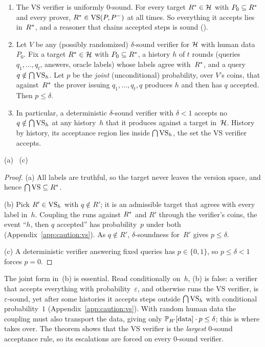 \begin{theorem}\label{thm:caution:vs}
\leavevmode
\begin{enumerate}[label=(\alph*)]
\item The VS verifier is uniformly $0$-sound. For every target $R^{*}\in\mathcal{H}$ with $P_0\subseteq R^{*}$ and every prover, $R^{*}\in\mathrm{VS}(P,P^-)$ at all times. So everything it accepts lies in~$R^{*}$, and a reasoner that chains accepted steps is sound ().
\item Let $V$ be any (possibly randomized) $\delta$-sound verifier for $\mathcal{H}$ with human data $P_0$. Fix a target $R^{*}\in\mathcal{H}$ with $P_0\subseteq R^{*}$, a history $h$ of $t$ rounds (queries $q_1,\dots,q_t$, answers, oracle labels) whose labels agree with~$R^{*}$, and a query $q\notin\bigcap\mathrm{VS}_h$. Let $p$ be the \emph{joint} (unconditional) probability, over $V$'s coins, that against~$R^{*}$ the prover issuing $q_1,\dots,q_t,q$ produces $h$ and then has $q$ accepted. Then $p\le\delta$.
\item In particular, a deterministic $\delta$-sound verifier with $\delta<1$ accepts no $q\notin\bigcap\mathrm{VS}_h$ at any history~$h$ that it produces against a target in~$\mathcal{H}$. History by history, its acceptance region lies inside $\bigcap\mathrm{VS}_h$, the set the VS verifier accepts.
\end{enumerate}
\hfill{} (a)\  (c)
\end{theorem}

\begin{proof}
(a) All labels are truthful, so the target never leaves the version space, and hence $\bigcap\mathrm{VS}\subseteq R^{*}$.

(b) Pick $R'\in\mathrm{VS}_h$ with $q\notin R'$; it is an admissible target that agrees with every label in~$h$. Coupling the runs against $R^{*}$ and $R'$ through the verifier's coins, the event ``$h$, then $q$ accepted'' has probability~$p$ under both (Appendix~\ref{app:caution:vs}). As $q\notin R'$, $\delta$-soundness for~$R'$ gives $p\le\delta$.

(c) A deterministic verifier answering fixed queries has $p\in\{0,1\}$, so $p\le\delta<1$ forces $p=0$.
\end{proof}

The joint form in~(b) is essential. Read conditionally on~$h$, (b) is false: a verifier that accepts everything with probability~$\varepsilon$, and otherwise runs the VS verifier, is $\varepsilon$-sound, yet after some histories it accepts steps outside $\bigcap\mathrm{VS}_h$ with conditional probability~$1$ (Appendix~\ref{app:caution:vs}). With random human data the coupling must also transport the data, giving only $\mathbb{P}_{R'}[\text{data}]\cdot p\le\delta$; this is where  takes over. The theorem shows that the VS verifier is the \emph{largest} $0$-sound acceptance rule, so its escalations are forced on every $0$-sound verifier.

